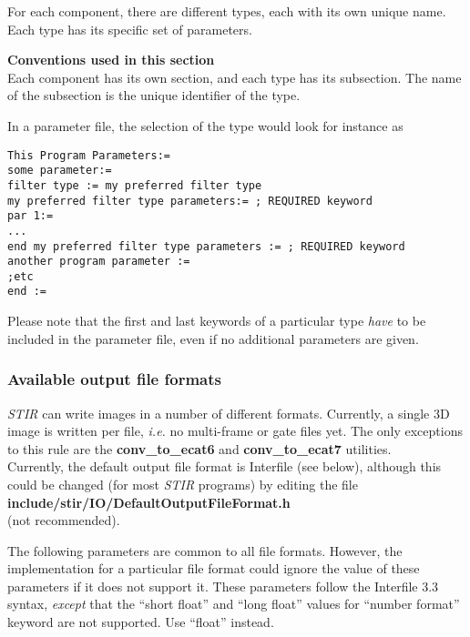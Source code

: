 \documentclass{article}
\begin{document}
For each component, there are different types, each with its 
own unique name. Each type has its specific set of parameters. 

\textbf{Conventions used in this section}\\
Each component has its own section, and each type has its subsection. 
The name of the subsection is the unique identifier of the type.


In a parameter file, the selection of the type would look for 
instance as

\begin{verbatim}
This Program Parameters:=
some parameter:=
filter type := my preferred filter type 
my preferred filter type parameters:= ; REQUIRED keyword 
par 1:= 
... 
end my preferred filter type parameters := ; REQUIRED keyword
another program parameter :=
;etc
end :=
\end{verbatim}


Please note that the first and last keywords of a particular 
type \textit{have} to be included in the parameter file, even if no 
additional parameters are given.


\subsubsection{
Available output file formats}
\label{sec:outputfileformats}

\textit{STIR} can write images in a number of different formats. Currently, 
a single 3D image is written per file, \textit{i.e.} no multi-frame 
or gate files yet. The only exceptions to this rule are the \textbf{conv\_to\_ecat6} 
and \textbf{conv\_to\_ecat7} utilities.\\
Currently, the default output file format is Interfile (see below), 
although this could be changed (for most \textit{STIR} programs) by 
editing the file\\
 \textbf{include/stir/IO/DefaultOutputFileFormat.h}\\ 
(not recommended).

{ 
}
\label{ref:outputcommonparameters}
The following parameters are common to all file formats. However, 
the implementation for a particular file format could ignore 
the value of these parameters if it does not support it. These 
parameters follow the Interfile 3.3 syntax, \textit{except} that the 
``short float'' and ``long float'' values for ``number format'' 
keyword are not supported. Use ``float'' instead.
\end{document}
